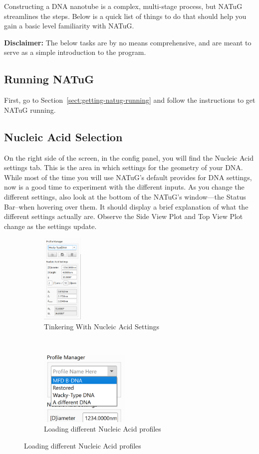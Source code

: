 \documentclass[titlepage]{article}
\begin{document}
	Constructing a DNA nanotube is a complex, multi-stage process, but NATuG streamlines the steps. Below is a quick list of things to do that should help you gain a basic level familiarity with NATuG. 
	
	\textbf{Disclaimer:} The below tasks are by no means comprehensive, and are meant to serve as a simple introduction to the program.
	
	\subsection{Running NATuG}
	First, go to Section~\ref{sect:getting-natug-running} and follow the instructions to get NATuG running.
	
	\subsection{Nucleic Acid Selection}
	
	On the right side of the screen, in the config panel, you will find the Nucleic Acid settings tab. This is the area in which settings for the geometry of your DNA. While most of the time you will use NATuG's default provides for DNA settings, now is a good time to experiment with the different inputs. As you change the different settings, also look at the bottom of the NATuG's window---the Status Bar--when hovering over them. It should display a brief explanation of what the different settings actually are. Observe the Side View Plot and Top View Plot change as the settings update.
	
	\begin{figure}[h]
		\caption{Experimenting with Nucleic Acid settings}
		\centering
		\begin{subfigure}{.5\textwidth}
			\centering
			\includegraphics[height=1.7in]{nucleic-acid-tinkering.png}
			\caption{Tinkering With Nucleic Acid Settings}
		\end{subfigure}%
		~
		\begin{subfigure}{.5\textwidth}
			\centering
			\includegraphics[width=1.7in]{nucleic-acid-tinkering-2.png}
			\caption{Loading different Nucleic Acid profiles}
		\end{subfigure}
	\end{figure}
		
\end{document}
